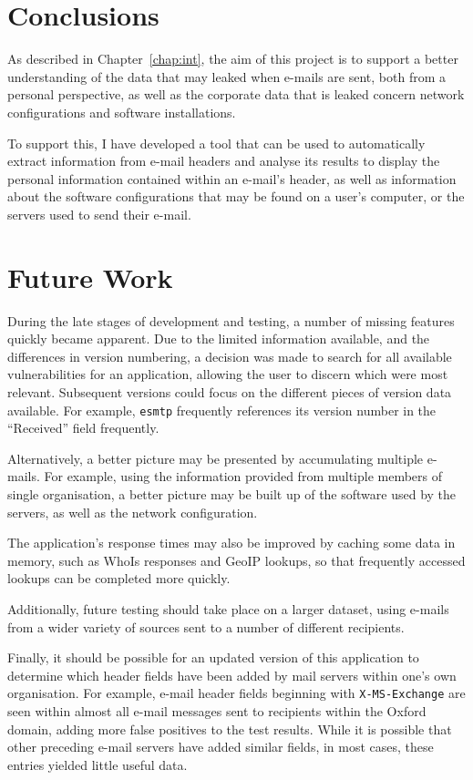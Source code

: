\section{Conclusions}

As described in Chapter~\ref{chap:int}, the aim of this project is to support a
better understanding of the data that may leaked when e-mails are sent, both
from a personal perspective, as well as the corporate data that is leaked
concern network configurations and software installations.

To support this, I have developed a tool that can be used to automatically
extract information from e-mail headers and analyse its results to display the
personal information contained within an e-mail's header, as well as
information about the software configurations that may be found on a user's
computer, or the servers used to send their e-mail.




\section{Future Work}

During the late stages of development and testing, a number of missing features
quickly became apparent. Due to the limited information available, and the
differences in version numbering, a decision was made to search for all
available vulnerabilities for an application, allowing the user to discern
which were most relevant.  Subsequent versions could focus on the different
pieces of version data available.  For example, \texttt{esmtp} frequently
references its version number in the ``Received'' field frequently.

Alternatively, a better picture may be presented by accumulating multiple
e-mails. For example, using the information provided from multiple members of
single organisation, a better picture may be built up of the software used by
the servers, as well as the network configuration.

The application's response times may also be improved by caching some data in
memory, such as WhoIs responses and GeoIP lookups, so that frequently accessed
lookups can be completed more quickly.

Additionally, future testing should take place on a larger dataset, using
e-mails from a wider variety of sources sent to a number of different
recipients.  

Finally, it should be possible for an updated version of this application to
determine which header fields have been added by mail servers within one's own
organisation.  For example, e-mail header fields beginning with
\texttt{X-MS-Exchange} are seen within almost all e-mail messages sent to
recipients within the Oxford domain, adding more false positives to the test
results. While it is possible that other preceding e-mail servers have added
similar fields, in most cases, these entries yielded little useful data.

